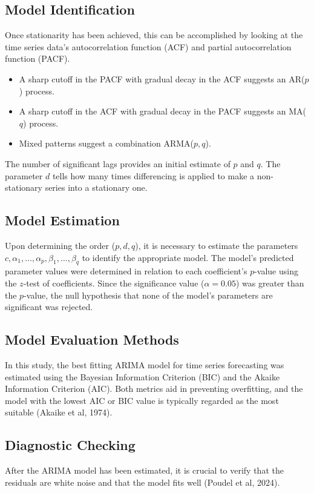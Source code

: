 \documentclass[12pt,a4paper]{report} %
\begin{document}
\subsection{Model Identification}
Once stationarity has been achieved, this can be accomplished by looking at the time series data's autocorrelation function (ACF) and partial autocorrelation function (PACF). 
\begin{itemize}
	\item A sharp cutoff in the PACF with gradual decay in the ACF suggests an AR($p$) process.
	\item A sharp cutoff in the ACF with gradual decay in the PACF suggests an MA($q$) process.
	\item Mixed patterns suggest a combination ARMA($p,q$).
\end{itemize}
The number of significant lags provides an initial estimate of $p$ and $q$. The parameter $d$ tells how many times differencing is applied to make a non-stationary series into a stationary one.

\subsection{Model Estimation}
Upon determining the order ($p,d,q$), it is necessary to estimate the parameters $c, \alpha_1, \ldots, \alpha_p, \beta_1, \ldots, \beta_q$ to identify the appropriate model. The model's predicted parameter values were determined in relation to each coefficient's $p$-value using the $z$-test of coefficients. Since the significance value ($\alpha = 0.05$) was greater than the $p$-value, the null hypothesis that none of the model's parameters are significant was rejected.

\subsection{Model Evaluation Methods }
In this study, the best fitting ARIMA model for time series forecasting was estimated using the Bayesian Information Criterion (BIC) and the Akaike Information Criterion (AIC). Both metrics aid in preventing overfitting, and the model with the lowest AIC or BIC value is typically regarded as the most suitable (Akaike et al, 1974).

\subsection{Diagnostic Checking}
After the ARIMA model has been estimated, it is crucial to verify that the residuals are white noise and that the model fits well (Poudel et al, 2024).
\end{document}
